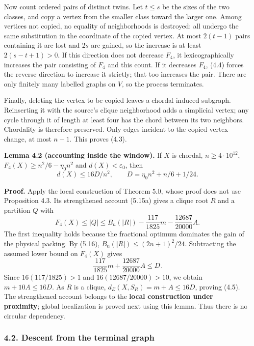 \documentclass[english,11pt,a4paper]{article}
\begin{document}
Now count ordered pairs of distinct twins. Let \(t\le s\) be the sizes of the two classes, and copy a vertex from the smaller class toward the larger one. Among vertices not copied, no equality of neighborhoods is destroyed: all undergo the same substitution in the coordinate of the copied vertex. At most \(2(t-1)\) pairs containing it are lost and \(2s\) are gained, so the increase is at least \(2(s-t+1)>0\). If this direction does not decrease \(F_4\), it lexicographically increases the pair consisting of \(F_4\) and this count. If it decreases \(F_4\), (4.4) forces the reverse direction to increase it strictly; that too increases the pair. There are only finitely many labelled graphs on \(V\), so the process terminates.

Finally, deleting the vertex to be copied leaves a chordal induced subgraph. Reinserting it with the source's clique neighborhood adds a simplicial vertex; any cycle through it of length at least four has the chord between its two neighbors. Chordality is therefore preserved. Only edges incident to the copied vertex change, at most \(n-1\). This proves (4.3).


\textbf{Lemma 4.2 (accounting inside the window).} If \(X\) is chordal, \(n\ge4\cdot10^{12}\), \(F_4(X)\ge n^2/6-\eta_0n^2\) and \(d(X)<\varepsilon_0\), then \[
d(X)\le16D/n^2,\qquad D=\eta_0n^2+n/6+1/24.
\tag{4.5}
\]

\textbf{Proof.} Apply the local construction of Theorem 5.0, whose proof does not use Proposition 4.3. Its strengthened account (5.15a) gives a clique root \(R\) and a partition \(Q\) with \[
F_4(X)\le |Q|\le B_n(|R|)-\frac{117}{1825}m-\frac{12687}{20000}A.
\] The first inequality holds because the fractional optimum dominates the gain of the physical packing. By (5.16), \(B_n(|R|)\le(2n+1)^2/24\). Subtracting the assumed lower bound on \(F_4(X)\) gives \[
\frac{117}{1825}m+\frac{12687}{20000}A\le D.
\] Since \(16(117/1825)>1\) and \(16(12687/20000)>10\), we obtain \(m+10A\le16D\). As \(R\) is a clique, \(d_E(X,S_R)=m+A\le16D\), proving (4.5). The strengthened account belongs to the \textbf{local construction under proximity}; global localization is proved next using this lemma. Thus there is no circular dependency.

\subsubsection{4.2. Descent from the terminal graph}\label{descent-from-the-terminal-graph}
\end{document}
